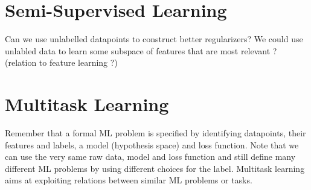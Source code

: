 \documentclass[12pt]{report}
\begin{document}

\section{Semi-Supervised Learning} 
\label{sec_ssl_regularization}
Can we use unlabelled datapoints to construct better regularizers? We could use unlabled data 
to learn some subspace of features that are most relevant ? (relation to feature learning ?)

\section{Multitask Learning} 
\label{sec_mtl_regularization}
Remember that a formal ML problem is specified by identifying 
datapoints, their features and labels, a model (hypothesis space)
and loss function. Note that we can use the very same raw data, model 
and loss function and still define many different ML problems by 
using different choices for the label. Multitask learning aims at 
exploiting relations between similar ML problems or tasks. 
\end{document}
